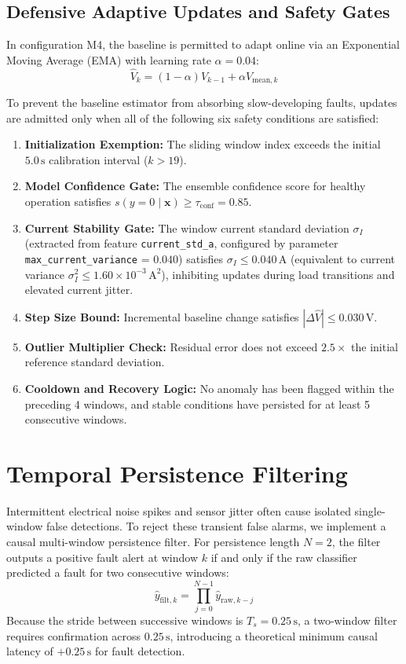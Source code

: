 \documentclass[conference]{IEEEtran}
\begin{document}
\subsection{Defensive Adaptive Updates and Safety Gates}
In configuration M4, the baseline is permitted to adapt online via an Exponential Moving Average (EMA) with learning rate $\alpha = 0.04$:
\begin{equation}
\hat{V}_{k} = (1 - \alpha)\hat{V}_{k-1} + \alpha V_{\text{mean}, k}
\label{eq:ema}
\end{equation}

To prevent the baseline estimator from absorbing slow-developing faults, updates are admitted only when all of the following six safety conditions are satisfied:
\begin{enumerate}
    \item \textbf{Initialization Exemption:} The sliding window index exceeds the initial $5.0\,\text{s}$ calibration interval ($k > 19$).
    \item \textbf{Model Confidence Gate:} The ensemble confidence score for healthy operation satisfies $s(y=0 \mid \mathbf{x}) \ge \tau_{\text{conf}} = 0.85$.
    \item \textbf{Current Stability Gate:} The window current standard deviation $\sigma_I$ (extracted from feature \texttt{current\_std\_a}, configured by parameter \texttt{max\_current\_variance} = $0.040$) satisfies $\sigma_I \le 0.040\,\text{A}$ (equivalent to current variance $\sigma_I^2 \le 1.60 \times 10^{-3}\,\text{A}^2$), inhibiting updates during load transitions and elevated current jitter.
    \item \textbf{Step Size Bound:} Incremental baseline change satisfies $|\Delta \hat{V}| \le 0.030\,\text{V}$.
    \item \textbf{Outlier Multiplier Check:} Residual error does not exceed $2.5\times$ the initial reference standard deviation.
    \item \textbf{Cooldown and Recovery Logic:} No anomaly has been flagged within the preceding 4 windows, and stable conditions have persisted for at least 5 consecutive windows.
\end{enumerate}

\section{Temporal Persistence Filtering}
Intermittent electrical noise spikes and sensor jitter often cause isolated single-window false detections. To reject these transient false alarms, we implement a causal multi-window persistence filter. For persistence length $N=2$, the filter outputs a positive fault alert at window $k$ if and only if the raw classifier predicted a fault for two consecutive windows:
\begin{equation}
\hat{y}_{\text{filt}, k} = \prod_{j=0}^{N-1} \hat{y}_{\text{raw}, k-j}
\label{eq:persistence}
\end{equation}
Because the stride between successive windows is $T_s = 0.25\,\text{s}$, a two-window filter requires confirmation across $0.25\,\text{s}$, introducing a theoretical minimum causal latency of $+0.25\,\text{s}$ for fault detection.
\end{document}
